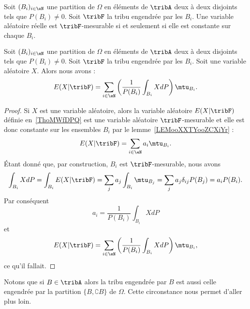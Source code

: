 \begin{lemma}       \label{LEMooXXTYooZCXiYr}
    Soit \( (B_i)_{i\in\eN}\) une partition de \( \Omega\) en éléments de \( \tribA\) deux à deux disjoints tels que \( P(B_i)\neq 0\). Soit \( \tribF\) la tribu engendrée par les \( B_i\). Une variable aléatoire réelle est \( \tribF\)-mesurable si et seulement si elle est constante sur chaque \( B_i\).
\end{lemma}

\begin{proposition}
        Soit \( (B_i)_{i\in\eN}\) une partition de \( \Omega\) en éléments de \( \tribA\) deux à deux disjoints tels que \( P(B_i)\neq 0\). Soit \( \tribF\) la tribu engendrée par les \( B_i\). Soit une variable aléatoire \( X\). Alors nous avons :
    \begin{equation}    \label{EqCibwoG}
        E(X|\tribF)=\sum_{i\in \eN}\left( \frac{1}{ P(B_i) }\int_{B_i}XdP \right)\mtu_{B_i}.
    \end{equation}
\end{proposition}

\begin{proof}
    Si \( X\) est une variable aléatoire, alors la variable aléatoire \( E(X|\tribF)\) définie en~\ref{ThoMWfDPQ} est une variable aléatoire \( \tribF\)-mesurable et elle est donc constante sur les ensembles \( B_i\) par le lemme~\ref{LEMooXXTYooZCXiYr} :
    \begin{equation}
        E(X|\tribF)=\sum_{i\in\eN}a_i\mtu_{B_i}.
    \end{equation}
    Étant donné que, par construction, \( B_i\) est \( \tribF\)-mesurable, nous avons
    \begin{equation}
            \int_{B_i}XdP=\int_{B_i}E(X|\tribF)
            =\sum_ja_j\int_{B_i}\mtu_{B_j}
            =\sum_ja_j\delta_{ij}P(B_j)
            =a_iP(B_i).
    \end{equation}
    Par conséquent
    \begin{equation}
        a_i=\frac{1}{ P(B_i) }\int_{B_i}XdP
    \end{equation}
    et
    \begin{equation}
        E(X|\tribF)=\sum_{i\in \eN}\left( \frac{1}{ P(B_i) }\int_{B_i}XdP \right)\mtu_{B_i},
    \end{equation}
    ce qu'il fallait.
\end{proof}

Notons que si \( B\in\tribA\) alors la tribu engendrée par \( B\) est aussi celle engendrée par la partition \( \{ B,\complement B \}\) de \( \Omega\). Cette circonstance nous permet d'aller plus loin.

